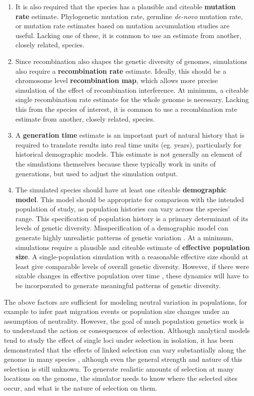 \documentclass[hidelinks]{article}
\begin{document}
\begin{enumerate}
\item
  It is also required that the species has a plausible and citeable
  \textbf{mutation rate} estimate. Phylogenetic mutation rate, 
  germline \emph{de-novo} mutation rate, or mutation rate
  estimates based on mutation accumulation studies are
  useful. Lacking one of these, it is common to use an estimate from
  another, closely related, species.
\item
  Since recombination also shapes the genetic diversity of genomes,
  simulations also require a \textbf{recombination rate} estimate.
  Ideally, this should be a chromosome level \textbf{recombination map}, which
  allows more precise simulation of the effect of recombination
  interference. At minimum, a citeable single recombination rate
  estimate for the whole genome is necessary. Lacking this from the species
  of interest, it is common to use a recombination rate estimate from
  another, closely related, species.
\item
  A \textbf{generation time} estimate is an important part of natural
  history that is required to translate results into real time units
  (eg. years), particularly for historical demographic models. This
  estimate is not generally an element of the simulations
  themselves because these typically work in units of generations, but
  used to adjust the simulation output.
\item
  The simulated species should have at least one citeable
  \textbf{demographic model}. This model should be appropriate for
  comparison with the intended population of study, as population
  histories can vary across the species' range. This specification of
  population history is a primary determinant of its levels of genetic
  diversity. Misspecification of a demographic model can generate highly
  unrealistic patterns of genetic variation \citep[e.g.,][]{Navascues2009}. At a
  minimum, simulations require a plausible and citeable estimate of 
  \textbf{effective population size}. A single-population simulation with a
  reasonable effective size should at least give comparable levels of
  overall genetic diversity. However, if there were sizable changes in
  effective population over time \citep{MacLeod2013}, these dynamics
  will have to be incorporated to generate meaningful patterns of
  genetic diversity.
\end{enumerate}

The above factors are sufficient for modeling neutral variation in
populations, for example to infer past migration events or population
size changes under an assumption of neutrality. However, the goal of
much population genetics work is to understand the action or
consequences of selection. Although analytical models tend to study the
effect of single loci under selection in isolation, it has been
demonstrated that the effects of linked selection can vary substantially
along the genome in many species \citep{Wolf2017}, although even the general
strength and nature of this selection is still unknown. To generate
realistic amounts of selection at many locations on the genome, the
simulator needs to know where the selected sites occur, and what is the
nature of selection on them.
\end{document}

